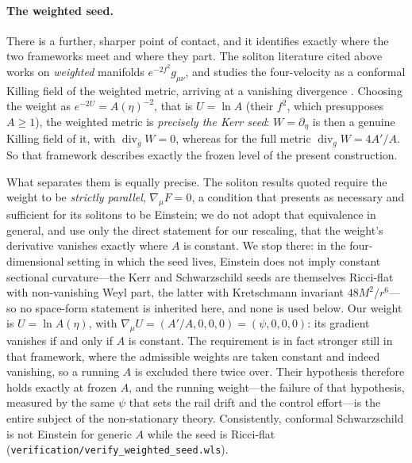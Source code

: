 \documentclass[12pt]{iopart}
\theoremstyle{plain}
\theoremstyle{definition}
\theoremstyle{remark}
\begin{document}
\paragraph{The weighted seed.} There is a further, sharper point of contact, and
it identifies exactly where the two frameworks meet and where they part. The
soliton literature cited above works on \emph{weighted} manifolds
$e^{-2f^2}g_{\mu\nu}$, and studies the four-velocity as a conformal Killing field
of the weighted metric, arriving at a vanishing divergence
\cite[eq.~(32)]{Lecian2026Eigenvalues}. Choosing the weight
as $e^{-2U}=A(\eta)^{-2}$, that is $U=\ln A$ (their $f^2$, which presupposes $A\ge1$), the
weighted metric is
\emph{precisely the Kerr seed}: $W=\partial_\eta$ is then a genuine Killing field
of it, with $\operatorname{div}_{\bar g}W=0$, whereas for the full metric
$\operatorname{div}_gW=4A'/A$. So that framework describes exactly the frozen
level of the present construction.

What separates them is equally precise. The soliton results quoted require the
weight to be \emph{strictly parallel}, $\nabla_\mu F=0$, a condition that
\cite[Theorem~T8]{Lecian2026Eigenvalues} presents as necessary and sufficient for its
solitons to be Einstein; we do not adopt that equivalence in general, and use only the
direct statement for our rescaling, that the weight's derivative vanishes exactly where
$A$ is constant. We stop there: in
the four-dimensional setting in which the seed lives, Einstein does not imply
constant sectional curvature---the Kerr and Schwarzschild seeds are themselves
Ricci-flat with non-vanishing Weyl part, the latter with Kretschmann invariant
$48M^2/r^6$---so no space-form statement is inherited here, and none is used
below. Our weight is $U=\ln A(\eta)$, with
$\nabla_\mu U=(A'/A,0,0,0)=(\psi,0,0,0)$: its gradient vanishes if and only if $A$ is
constant. The requirement is in fact stronger still in that framework, where the
admissible weights are taken constant and indeed vanishing, so a running $A$ is
excluded there twice over. Their hypothesis therefore holds exactly at frozen $A$, and the running
weight---the failure of that hypothesis, measured by the same $\psi$ that
sets the rail drift and the control effort---is the entire subject of the
non-stationary theory. Consistently, conformal Schwarzschild is not Einstein for
generic $A$ while the seed is Ricci-flat
(\texttt{verification/verify\_weighted\_seed.wls}).
\end{document}
